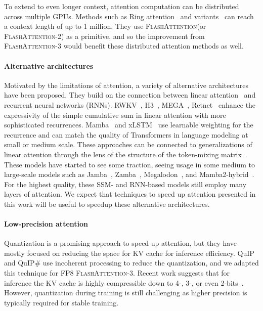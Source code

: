 \documentclass{article}
\newcommand{\fa}{\textsc{FlashAttention}\xspace}
\newcommand{\faa}{\textsc{FlashAttention-2}\xspace}
\newcommand{\fat}{\textsc{FlashAttention-3}\xspace}  %
\begin{document}
To extend to even longer context, attention computation can be distributed
across multiple GPUs.
Methods such as Ring attention~\citep{liu2023ring,liu2024world} and
variants~\citep{brandon2023striped} can reach a context length of up to 1
million.
They use \fa (or \faa) as a primitive, and so the improvement from \fat would
benefit these distributed attention methods as well.

\paragraph{Alternative architectures}
Motivated by the limitations of attention, a variety of alternative
architectures have been proposed.
They build on the connection between linear
attention~\citep{katharopoulos2020transformers} and recurrent neural networks
(RNNs).
RWKV~\citep{peng2023rwkv}, H3~\citep{dao2023hungry}, MEGA~\citep{ma2023mega},
Retnet~\citep{sun2023retentive}  enhance the expressivity of the simple
cumulative sum in linear attention with more sophisticated recurrences.
Mamba~\citep{gu2023mamba} and xLSTM~\citep{beck2024xlstm} use learnable
weighting for the recurrence and can match the quality of Transformers in
language modeling at small or medium scale.
These approaches can be connected to generalizations of linear attention through
the lens of the structure of the token-mixing matrix~\citep{dao2024transformers}.
These models have started to see some traction, seeing usage in some medium to
large-scale models such as Jamba~\citep{jamba}, Zamba~\citep{zamba},
Megalodon~\citep{ma2024megalodon}, and Mamba2-hybrid~\citep{waleffe2024empirical}.
For the highest quality, these SSM- and RNN-based models still employ
many layers of attention.
We expect that techniques to speed up attention presented in this work will be
useful to speedup these alternative architectures.

\paragraph{Low-precision attention}
Quantization is a promising approach to speed up attention, but they have mostly
focused on reducing the space for KV cache for inference efficiency.
QuIP~\citep{chee2024quip} and QuIP\#\citep{tseng2024quip} use incoherent processing to reduce the quantization,
and we adapted this technique for FP8 \fat.
Recent work suggests that for inference the KV cache is highly compressible down to 4-, 3-, or
even 2-bits~\citep{hooper2024kvquant, liu2024kivi}.
However, quantization during training is still challenging as higher precision
is typically required for stable training.
\end{document}
